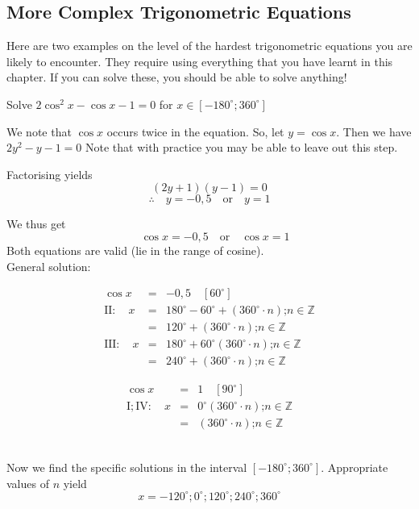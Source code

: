 \subsection{More Complex Trigonometric Equations}
Here are two examples on the level of the hardest trigonometric equations you are likely to encounter. They require using everything that you have learnt in this chapter. If you can solve these, you should be able to solve anything! 

\begin{wex}{}
{
Solve $2\cos^2x-\cos x - 1 = 0$ for $x\in [-180^\circ;360^\circ]$
}
{
We note that $\cos x$ occurs twice in the equation. So, let $y=\cos x$. Then we have $2y^2-y-1=0$
Note that with practice you may be able to leave out this step.

Factorising yields
\[(2y+1)(y-1)=0 \]
\[\therefore \quad y = -0,5 \quad \mbox{or} \quad y=1 \]
}

We thus get
\[ \quad \cos x = -0,5 \quad \mbox{or} \quad \cos x=1 \]
Both equations are valid (\ie lie in the range of cosine).\\
General solution:

\begin{minipage}{0.6\textwidth}
\begin{eqnarray*}
\cos x &=& -0,5 \quad [60^\circ]\\
\mathrm{II:} \quad x &=& 180^\circ - 60^\circ +(360^\circ\cdot n) \mbox{;} n\in\mathbb{Z}\\
&=& 120^\circ +(360^\circ\cdot n) \mbox{;} n\in\mathbb{Z}\\
\mathrm{III:} \quad x &=& 180^\circ + 60^\circ (360^\circ\cdot n) \mbox{;} n\in\mathbb{Z}\\
&=& 240^\circ +(360^\circ\cdot n) \mbox{;} n\in\mathbb{Z}
\end{eqnarray*}
\end{minipage}
\begin{minipage}{0.4\textwidth}
\begin{eqnarray*}
\cos x &=& 1 \quad [90^\circ] \\
\mathrm{I; IV:} \quad x &=& 0^\circ  (360^\circ\cdot n) \mbox{;} n\in\mathbb{Z}\\
&=& (360^\circ\cdot n) \mbox{;} n\in\mathbb{Z}
\end{eqnarray*}
\end{minipage}\\

Now we find the specific solutions in the interval $[-180^\circ;360^\circ]$. Appropriate values of $n$ yield
\[x= -120^\circ; 0^\circ; 120^\circ; 240^\circ; 360^\circ \]
\end{wex}

